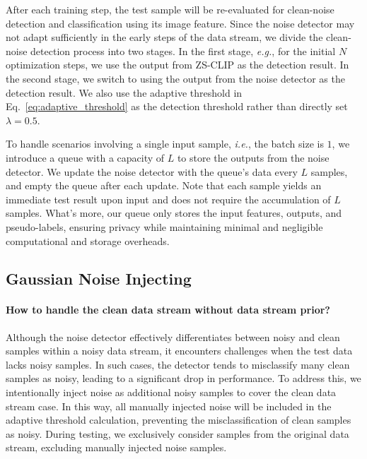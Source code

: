 After each training step, the test sample will be re-evaluated for clean-noise detection and classification using its image feature. Since the noise detector may not adapt sufficiently in the early steps of the data stream, we divide the clean-noise detection process into two stages. 
In the first stage, \textit{e.g.}, for the initial $N$ optimization steps, we use the output from ZS-CLIP as the detection result. 
In the second stage, we switch to using the output from the noise detector as the detection result.
We also use the adaptive threshold in Eq.~\eqref{eq:adaptive_threshold} as the detection threshold rather than directly set $\lambda=0.5$.


To handle scenarios involving a single input sample, \textit{i.e.}, the batch size is $1$, we introduce a queue with a capacity of $L$ to store the outputs from the noise detector.
We update the noise detector with the queue's data every $L$ samples, and empty the queue after each update. Note that each sample yields an immediate test result upon input and does not require the accumulation of $L$ samples.
What's more, our queue only stores the input features, outputs, and pseudo-labels, ensuring privacy while maintaining minimal and negligible computational and storage overheads.

\vspace{-5pt}
\subsection{Gaussian Noise Injecting}
\vspace{-5pt}

\paragraph{How to handle the clean data stream without data stream prior?}
Although the noise detector effectively differentiates between noisy and clean samples within a noisy data stream, it encounters challenges when the test data lacks noisy samples. In such cases, the detector tends to misclassify many clean samples as noisy, leading to a significant drop in performance.
To address this, we intentionally inject noise as additional noisy samples to cover the clean data stream case. In this way, all manually injected noise will be included in the adaptive threshold calculation, preventing the misclassification of clean samples as noisy. During testing, we exclusively consider samples from the original data stream, excluding manually injected noise samples.

